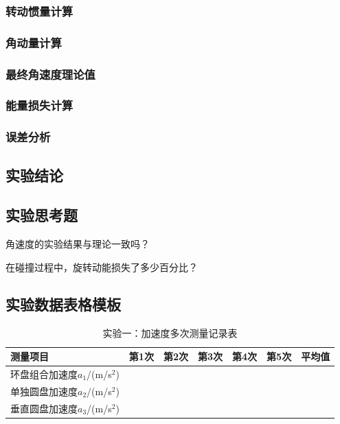 \documentclass[dvipsnames, svgnames,a4paper,11pt]{article}
\newcommand{\recordblank}[1]{\par\vspace*{#1}\par}
\begin{document}
\subsubsection{转动惯量计算}
\recordblank{3.5cm}
\subsubsection{角动量计算}
\recordblank{3.5cm}
\subsubsection{最终角速度理论值}
\recordblank{3.5cm}
\subsubsection{能量损失计算}
\recordblank{3.5cm}
\subsubsection{误差分析}
\recordblank{3.5cm}
\subsection{实验结论}
\recordblank{3.5cm}
\subsection{实验思考题}

\begin{question}
角速度的实验结果与理论一致吗？
\end{question}
\recordblank{4cm}

\begin{question}
在碰撞过程中，旋转动能损失了多少百分比？
\end{question}
\recordblank{4cm}


\clearpage
\appendix
\appendixpage
\addappheadtotoc

\subsection{实验数据表格模板}

\begin{table}[H]
	\renewcommand\arraystretch{2.0}
	\caption{实验一：加速度多次测量记录表}
	\centering
	\begin{tabularx}{\textwidth}{|X|X|X|X|X|X|X|}
	\hline
	测量项目 & 第1次 & 第2次 & 第3次 & 第4次 & 第5次 & 平均值 \\
	\hline
	环盘组合加速度$a_1$/(m/s$^2$) & & & & & & \\
	\hline
	单独圆盘加速度$a_2$/(m/s$^2$) & & & & & & \\
	\hline
	垂直圆盘加速度$a_3$/(m/s$^2$) & & & & & & \\
	\hline
	\end{tabularx}
\end{table}
\end{document}
